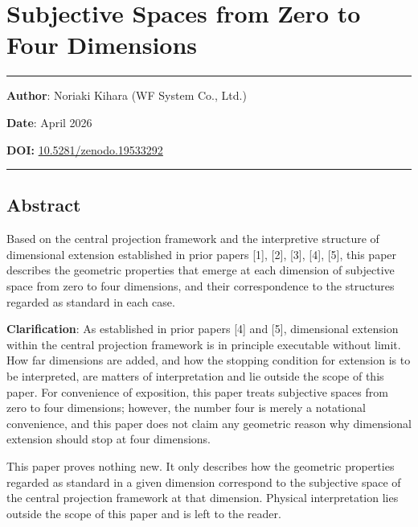 \documentclass[a4paper,11pt]{article}
\theoremstyle{definition}
\begin{document}
\section{Subjective Spaces from Zero to Four Dimensions}\label{subjective-spaces-from-zero-to-four-dimensions}

\begin{center}\rule{0.5\linewidth}{0.5pt}\end{center}

\textbf{Author}: Noriaki Kihara (WF System Co., Ltd.)

\textbf{Date}: April 2026

\textbf{DOI:} \href{https://doi.org/10.5281/zenodo.19533292}{10.5281/zenodo.19533292}

\begin{center}\rule{0.5\linewidth}{0.5pt}\end{center}

\subsection{Abstract}\label{abstract}

Based on the central projection framework and the interpretive structure of dimensional extension established in prior papers {[}1{]}, {[}2{]}, {[}3{]}, {[}4{]}, {[}5{]}, this paper describes the geometric properties that emerge at each dimension of subjective space from zero to four dimensions, and their correspondence to the structures regarded as standard in each case.

\textbf{Clarification}: As established in prior papers {[}4{]} and {[}5{]}, dimensional extension within the central projection framework is in principle executable without limit. How far dimensions are added, and how the stopping condition for extension is to be interpreted, are matters of interpretation and lie outside the scope of this paper. For convenience of exposition, this paper treats subjective spaces from zero to four dimensions; however, the number four is merely a notational convenience, and this paper does not claim any geometric reason why dimensional extension should stop at four dimensions.

This paper proves nothing new. It only describes how the geometric properties regarded as standard in a given dimension correspond to the subjective space of the central projection framework at that dimension. Physical interpretation lies outside the scope of this paper and is left to the reader.
\end{document}
